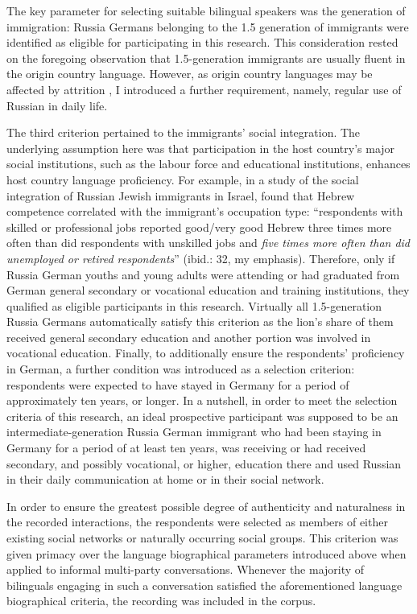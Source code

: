 The key parameter for selecting suitable bilingual speakers was the generation of immigration: Russia Germans belonging to the 1.5 generation of immigrants were identified as eligible for participating in this research. This consideration rested on the foregoing observation that 1.5-generation immigrants are usually fluent in the origin country language. However, as origin country languages may be affected by attrition \citep[on the development of Russian in Russia German immigrants of the 1.5 generation, see][]{meng01,meng-protas}, I introduced a further requirement, namely, regular use of Russian in daily life. 

The third criterion pertained to the immigrants' social integration. The underlying assumption here was that participation in the host country's major social institutions, such as the labour force and educational institutions, enhances host country language proficiency. For example, in a study of the social integration of Russian Jewish immigrants in Israel, \citet[][]{remennick03} found that Hebrew competence correlated with the immigrant's occupation type: ``respondents with skilled or professional jobs reported good/very good Hebrew three times more often than did respondents with unskilled jobs and \textit{five times more often than did unemployed or retired respondents}'' (ibid.: 32, my emphasis). Therefore, only if Russia German youths and young adults were attending or had graduated from German general secondary or vocational education and training institutions, they qualified as eligible participants in this research. Virtually all 1.5-generation Russia Germans automatically satisfy this criterion as the lion's share of them received general secondary education and another portion was involved in vocational education. Finally, to additionally ensure the respondents' proficiency in German, a further condition was introduced as a selection criterion: respondents were expected to have stayed in Germany for a period of approximately ten years, or longer. In a nutshell, in order to meet the selection criteria of this research, an ideal prospective participant was supposed to be an intermediate-generation Russia German immigrant who had been staying in Germany for a period of at least ten years, was receiving or had received secondary, and possibly vocational, or higher, education there and used Russian in their daily communication at home or in their social network. 

In order to ensure the greatest possible degree of authenticity and naturalness in the recorded interactions, the respondents were selected as members of either existing social networks or naturally occurring social groups. 
This criterion was given primacy over the language biographical parameters introduced above when applied to informal multi-party conversations. Whenever the majority of bilinguals engaging in such a conversation satisfied the aforementioned language biographical criteria, the recording was included in the corpus.

